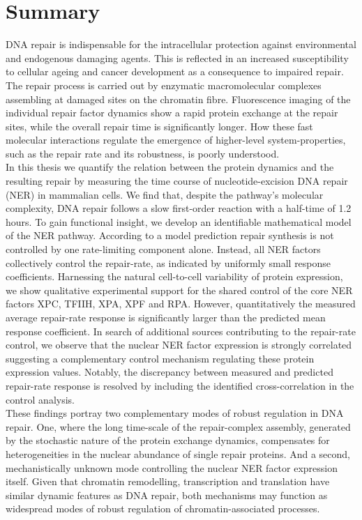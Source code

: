 \chapter*{Summary}
\thispagestyle{plain2}





DNA repair is indispensable for the intracellular protection against environmental and endogenous damaging agents. This is reflected in an increased susceptibility to cellular ageing and cancer development as a consequence to impaired repair. The repair process is carried out by enzymatic macromolecular complexes assembling at damaged sites on the chromatin fibre. Fluorescence imaging of the individual repair factor dynamics show a rapid protein exchange at the repair sites, while the overall repair time is significantly longer. How these fast molecular interactions regulate the emergence of higher-level system-properties, such as the repair rate and its robustness, is poorly understood.\\ 
In this thesis we quantify the relation between the protein dynamics and the resulting repair by measuring the time course of nucleotide-excision DNA repair (NER) in mammalian cells. We find that, despite the pathway's molecular complexity, DNA repair follows a slow first-order reaction with a half-time of 1.2 hours. To gain functional insight, we develop an identifiable mathematical model of the NER pathway. According to a model prediction repair synthesis is not controlled by one rate-limiting component alone. Instead, all NER factors collectively control the repair-rate, as indicated by uniformly small response coefficients. Harnessing the natural cell-to-cell variability of protein expression, we show qualitative experimental support for the shared control of the core NER factors XPC, TFIIH, XPA, XPF and RPA. However, quantitatively the measured average repair-rate response is significantly larger than the predicted mean response coefficient. In search of additional sources contributing to the repair-rate control, we observe that the nuclear NER factor expression is strongly correlated suggesting a complementary control mechanism regulating these protein expression values. Notably, the discrepancy between measured and predicted repair-rate response is resolved by including the identified cross-correlation in the control analysis. \\ 
These findings portray two complementary modes of robust regulation in DNA repair. One, where the long time-scale of the repair-complex assembly, generated by the stochastic nature of the protein exchange dynamics, compensates for heterogeneities in the nuclear abundance of single repair proteins. And a second, mechanistically unknown mode controlling the nuclear NER factor expression itself. Given that chromatin remodelling, transcription and translation have similar dynamic features as DNA repair, both mechanisms may function as widespread modes of robust regulation of chromatin-associated processes.



      
 


%